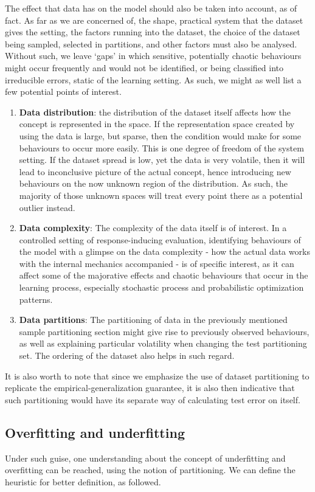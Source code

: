 \documentclass[10pt,oneside,oldfontcommands,dvipsnames,article]{memoir}
\begin{document}
The effect that data has on the model should also be taken into account, as of fact. As far as we are concerned of, the shape, practical system that the dataset gives the setting, the factors running into the dataset, the choice of the dataset being sampled, selected in partitions, and other factors must also be analysed. Without such, we leave `gaps' in which sensitive, potentially chaotic behaviours might occur frequently and would not be identified, or being classified into irreducible errors, static of the learning setting. As such, we might as well list a few potential points of interest. 
\begin{enumerate}[itemsep=1pt,topsep=0.5pt]
  \item \textbf{Data distribution}: the distribution of the dataset itself affects how the concept is represented in the space. If the representation space created by using the data is large, but sparse, then the condition would make for some behaviours to occur more easily. This is one degree of freedom of the system setting. If the dataset spread is low, yet the data is very volatile, then it will lead to inconclusive picture of the actual concept, hence introducing new behaviours on the now unknown region of the distribution. As such, the majority of those unknown spaces will treat every point there as a potential outlier instead. 
  \item \textbf{Data complexity}: The complexity of the data itself is of interest. In a controlled setting of response-inducing evaluation, identifying behaviours of the model with a glimpse on the data complexity - how the actual data works with the internal mechanics accompanied - is of specific interest, as it can affect some of the majorative effects and chaotic behaviours that occur in the learning process, especially stochastic process and probabilistic optimization patterns. 
  \item \textbf{Data partitions}: The partitioning of data in the previously mentioned sample partitioning section might give rise to previously observed behaviours, as well as explaining particular volatility when changing the test partitioning set. The ordering of the dataset also helps in such regard. 
\end{enumerate}
It is also worth to note that since we emphasize the use of dataset partitioning to replicate the empirical-generalization guarantee, it is also then indicative that such partitioning would have its separate way of calculating test error on itself. 
\subsection{Overfitting and underfitting}
Under such guise, one understanding about the concept of underfitting and overfitting \cite{gareth_james_introduction_2013} can be reached, using the notion of partitioning. We can define the heuristic for better definition, as followed. 
\end{document}
